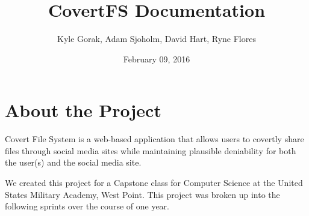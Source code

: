 \documentclass[letterpaper,10pt,english]{sphinxmanual}
\title{CovertFS Documentation}
\date{February 09, 2016}
\author{Kyle Gorak, Adam Sjoholm, David Hart, Ryne Flores}
\begin{document}
\maketitle
\tableofcontents

\chapter{About the Project}
\label{index:about-the-project}
Covert File System is a web-based application that allows users to covertly share files through social media sites while maintaining plausible deniability for both the user(s) and the social media site.

We created this project for a Capstone class for Computer Science at the United States Military Academy, West Point. This project was broken up into the following sprints over the course of one year.
\end{document}
